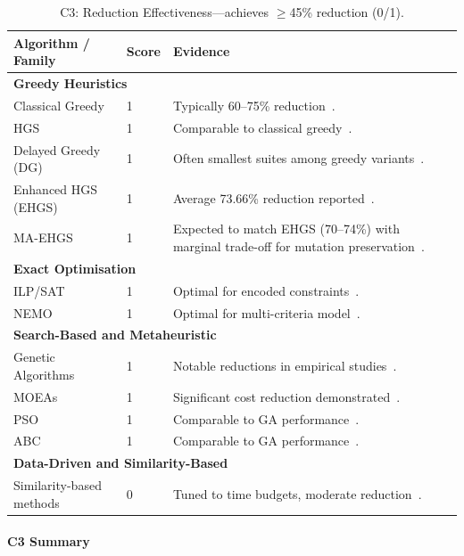 \begin{appendices}
\begin{table}[H]
  \centering
  \footnotesize
  \caption{C3: Reduction Effectiveness—achieves $\geq$45\% reduction (0/1).}
  \label{tab:app-c3}
  \begin{tabular}{@{}p{4.5cm}p{0.8cm}p{6.9cm}@{}}
    \toprule
    \textbf{Algorithm / Family} & \textbf{Score} & \textbf{Evidence} \\
    \midrule
    \multicolumn{3}{l}{\textbf{Greedy Heuristics}} \\
    Classical Greedy & 1 & Typically 60--75\% reduction~\cite{yoo2012,noemmer2020}. \\
    HGS & 1 & Comparable to classical greedy~\cite{yoo2012,noemmer2020}. \\
    Delayed Greedy (DG) & 1 & Often smallest suites among greedy variants~\cite{tallam2005,jehan2023}. \\
    Enhanced HGS (EHGS) & 1 & Average 73.66\% reduction reported~\cite{gladston2015}. \\
    MA-EHGS & 1 & Expected to match EHGS (70--74\%) with marginal trade-off for mutation preservation~\cite{lin2018,shi2018}. \\[0.2em]
    \multicolumn{3}{l}{\textbf{Exact Optimisation}} \\
    ILP/SAT & 1 & Optimal for encoded constraints~\cite{elbaum2002}. \\
    NEMO & 1 & Optimal for multi-criteria model~\cite{lin2018}. \\[0.2em]
    \multicolumn{3}{l}{\textbf{Search-Based and Metaheuristic}} \\
    Genetic Algorithms & 1 & Notable reductions in empirical studies~\cite{yoo2012}. \\
    MOEAs & 1 & Significant cost reduction demonstrated~\cite{wei2017}. \\
    PSO & 1 & Comparable to GA performance~\cite{ahuja2024}. \\
    ABC & 1 & Comparable to GA performance~\cite{ahuja2024}. \\[0.2em]
    \multicolumn{3}{l}{\textbf{Data-Driven and Similarity-Based}} \\
    Similarity-based methods & 0 & Tuned to time budgets, moderate reduction~\cite{bach2017}. \\
    \bottomrule
  \end{tabular}
\end{table}

\paragraph*{C3 Summary}


\end{appendices}
